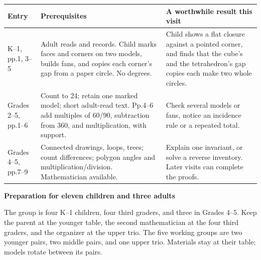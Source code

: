 \documentclass[11pt,letterpaper]{article}
\newcommand{\titleline}[1]{\par{\Large\bfseries #1}\par\vspace{4pt}}
\begin{document}
\begin{tabularx}{\linewidth}{|p{2.15cm}|Y|Y|}\hline
Entry & Prerequisites & A worthwhile result this visit\\\hline
K--1, pp.1, 3--5 & Adult reads and records. Child marks faces and corners on two models, builds fans, and copies each corner's gap from a paper circle. No degrees. & Child shows a flat closure against a pointed corner, and finds that the cube's and the tetrahedron's gap copies each make two whole circles.\\\hline
Grades 2--5, pp.1--6 & Count to 24; retain one marked model; short adult-read text. Pp.4--6 add multiples of 60/90, subtraction from 360, and multiplication, with support. & Check several models or fans, notice an incidence rule or a repeated total.\\\hline
Grades 4--5, pp.7--9 & Connected drawings, loops, trees; count differences; polygon angles and multiplication/division. Mathematician available. & Explain one invariant, or solve a reverse inventory. Later visits can complete the proofs.\\\hline
\end{tabularx}

\newpage
\titleline{Preparation for eleven children and three adults}
The group is four K--1 children, four third graders, and three in Grades 4--5. Keep the parent at the younger table, the second mathematician at the four third graders, and the organizer at the upper trio. The five working groups are two younger pairs, two middle pairs, and one upper trio. Materials stay at their table; models rotate between its pairs.
\end{document}
